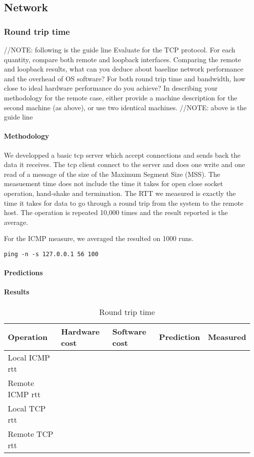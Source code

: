 \subsection{Network}

\subsubsection{Round trip time}

//NOTE: following is the guide line
Evaluate for the TCP protocol. For each quantity, compare both remote and loopback interfaces. Comparing the remote and loopback results, what can you deduce about baseline network performance and the overhead of OS software? For both round trip time and bandwidth, how close to ideal hardware performance do you achieve? In describing your methodology for the remote case, either provide a machine description for the second machine (as above), or use two identical machines.
//NOTE: above is the guide line

\paragraph{Methodology}
We developped a basic tcp server which accept connections and sends back the
data it receives.
The tcp client connect to the server and does one write and one read of a message of
the size of the Maximum Segment Size (MSS). The measuement time does not include the time it takes for open close socket operation, hand-shake and termination. The RTT we measured is exactly the time it takes for data to go through a round trip from the system to the remote host.
The operation is repeated 10,000 times and the result reported is the average.

For the ICMP measure, we averaged the resulted on 1000 runs.
\begin{verbatim}
ping -n -s 127.0.0.1 56 100 
\end{verbatim}

\paragraph{Predictions}
\paragraph{Results}
\begin{table}[h]
\begin{center}
\begin{tabular}{| l | l | l | l | l |}
\hline
Operation 			& Hardware cost 	& Software cost 		& Prediction 		& Measured \\
\hline
Local ICMP rtt		&				&					&				& 		\\
\hline
Remote ICMP rtt		&				&					&				& 		\\
\hline
Local TCP rtt		&				&					&				& 		\\
\hline
Remote TCP rtt		&				&					&				& 		\\
\hline


\end{tabular}
\end{center}
\caption{Round trip time\label{tab:rtt}}
\end{table}

